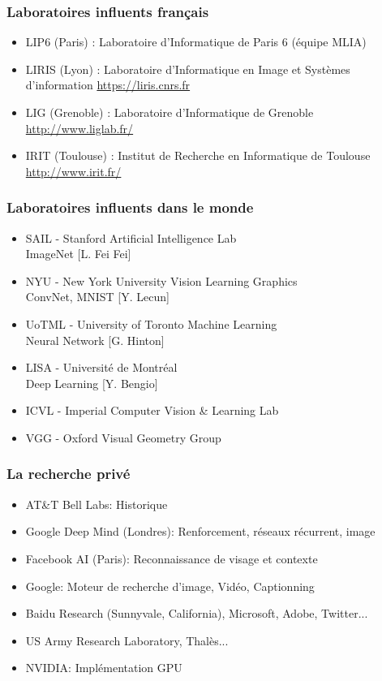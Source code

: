 \documentclass{beamer}
\begin{document}

\begin{frame}
\frametitle{Laboratoires influents français}

\begin{itemize}
\item LIP6 (Paris) : Laboratoire d'Informatique de Paris 6 (équipe MLIA)
\item LIRIS (Lyon) : Laboratoire d'Informatique en Image et Systèmes d'information \url{https://liris.cnrs.fr}
\item LIG (Grenoble) : Laboratoire d'Informatique de Grenoble \url{http://www.liglab.fr/}
\item IRIT (Toulouse) : Institut de Recherche en Informatique de Toulouse \url{http://www.irit.fr/}
\end{itemize}

\end{frame}


\begin{frame}
\frametitle{Laboratoires influents dans le monde}
\begin{itemize}
\item SAIL - Stanford Artificial Intelligence Lab \\
ImageNet [L. Fei Fei]
\item NYU - New York University Vision Learning Graphics \\
ConvNet, MNIST [Y. Lecun]
\item UoTML - University of Toronto Machine Learning \\
Neural Network [G. Hinton]
\item LISA - Université de Montréal \\
Deep Learning [Y. Bengio]
\item ICVL - Imperial Computer Vision \& Learning Lab
\item VGG - Oxford Visual Geometry Group 

\end{itemize}
\end{frame}


\begin{frame}
\frametitle{La recherche privé}

\begin{itemize}
\item AT\&T Bell Labs: Historique
\item Google Deep Mind (Londres): Renforcement, réseaux récurrent, image
\item Facebook AI (Paris): Reconnaissance de visage et contexte
\item Google: Moteur de recherche d'image, Vidéo, Captionning
\item Baidu Research (Sunnyvale, California), Microsoft, Adobe, Twitter...
\item US Army Research Laboratory, Thalès...
\item NVIDIA: Implémentation GPU
\end{itemize}

\end{frame}
\end{document}

